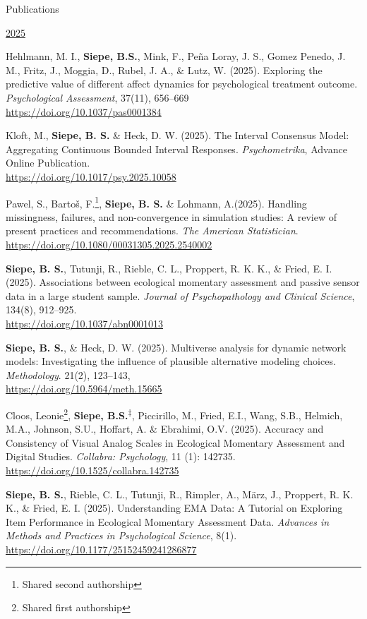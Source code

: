 \documentclass{resume} %
\begin{document}
\begin{rSection}{Publications}
\begin{etaremune}
\hspace{-0.75cm}\underline{2025}
    \item  Hehlmann, M. I., \textbf{Siepe, B.S.}, Mink, F., Peña Loray, J. S., Gomez Penedo, J. M., Fritz, J., Moggia, D., Rubel, J. A., \& Lutz, W. (2025). Exploring the predictive value of different affect dynamics for psychological treatment outcome. \textit{Psychological Assessment}, 37(11), 656–669\\
\url{https://doi.org/10.1037/pas0001384}
    \item Kloft, M., \textbf{Siepe, B. S.} \& Heck, D. W. (2025). The Interval Consensus Model: Aggregating Continuous Bounded Interval Responses. \textit{Psychometrika}, Advance Online Publication. \\ \url{https://doi.org/10.1017/psy.2025.10058}
    \item Pawel, S., Bartoš, F.\footnote[2]{Shared second authorship}, \textbf{Siepe, B. S.}\textsuperscript{\textdagger} \& Lohmann, A.\textsuperscript{\textdagger}(2025). Handling missingness, failures, and non-convergence in simulation studies: A review of present practices and recommendations. \textit{The American Statistician}.\\
\url{https://doi.org/10.1080/00031305.2025.2540002}
    \item \textbf{Siepe, B. S.}, Tutunji, R., Rieble, C. L., Proppert, R. K. K., \& Fried, E. I. (2025). Associations between ecological momentary assessment and passive sensor data in a large student sample. \textit{Journal of Psychopathology and Clinical Science}, 134(8), 912–925. \\ \url{https://doi.org/10.1037/abn0001013}
    \item \textbf{Siepe, B. S.}, \& Heck, D. W. (2025). Multiverse analysis for dynamic network models: Investigating the influence of plausible alternative modeling choices. \textit{Methodology}. 21(2), 123–143,   \\ \url{https://doi.org/10.5964/meth.15665}
    \item Cloos, Leonie\footnote[3]{Shared first authorship}, \textbf{Siepe, B.S.}\textsuperscript{$\ddagger$}, Piccirillo, M., Fried, E.I., Wang, S.B., Helmich, M.A., Johnson, S.U., Hoffart, A. \& Ebrahimi, O.V. (2025). Accuracy and Consistency of Visual Analog Scales in Ecological Momentary Assessment and Digital Studies. \textit{Collabra: Psychology}, 11 (1): 142735. \\
\url{https://doi.org/10.1525/collabra.142735}
    \item \textbf{Siepe, B. S.}, Rieble, C. L., Tutunji, R., Rimpler, A., März, J., Proppert, R. K. K., \& Fried, E. I. (2025). Understanding EMA Data: A Tutorial on Exploring Item Performance in Ecological Momentary Assessment Data. \textit{Advances in Methods and Practices in Psychological Science}, 8(1). \\ \url{https://doi.org/10.1177/25152459241286877}


\end{etaremune}
\end{rSection}
\end{document}
